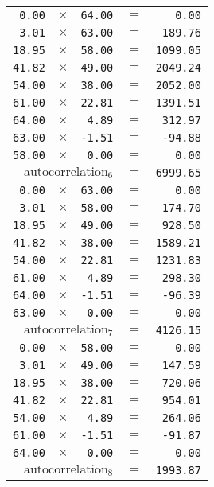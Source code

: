 {\begin{tabular}{rrrrr}
  \texttt{0.00} & $\times$ & \texttt{64.00} & $=$ & \texttt{0.00} \\
  \texttt{3.01} & $\times$ & \texttt{63.00} & $=$ & \texttt{189.76} \\
  \texttt{18.95} & $\times$ & \texttt{58.00} & $=$ & \texttt{1099.05} \\
  \texttt{41.82} & $\times$ & \texttt{49.00} & $=$ & \texttt{2049.24} \\
  \texttt{54.00} & $\times$ & \texttt{38.00} & $=$ & \texttt{2052.00} \\
  \texttt{61.00} & $\times$ & \texttt{22.81} & $=$ & \texttt{1391.51} \\
  \texttt{64.00} & $\times$ & \texttt{4.89} & $=$ & \texttt{312.97} \\
  \texttt{63.00} & $\times$ & \texttt{-1.51} & $=$ & \texttt{-94.88} \\
  \texttt{58.00} & $\times$ & \texttt{0.00} & $=$ & \texttt{0.00} \\
  \hline
  \multicolumn{3}{r}{$\text{autocorrelation}_6$} & $=$ & \texttt{6999.65} \\
  \hline
  \hline
  \texttt{0.00} & $\times$ & \texttt{63.00} & $=$ & \texttt{0.00} \\
  \texttt{3.01} & $\times$ & \texttt{58.00} & $=$ & \texttt{174.70} \\
  \texttt{18.95} & $\times$ & \texttt{49.00} & $=$ & \texttt{928.50} \\
  \texttt{41.82} & $\times$ & \texttt{38.00} & $=$ & \texttt{1589.21} \\
  \texttt{54.00} & $\times$ & \texttt{22.81} & $=$ & \texttt{1231.83} \\
  \texttt{61.00} & $\times$ & \texttt{4.89} & $=$ & \texttt{298.30} \\
  \texttt{64.00} & $\times$ & \texttt{-1.51} & $=$ & \texttt{-96.39} \\
  \texttt{63.00} & $\times$ & \texttt{0.00} & $=$ & \texttt{0.00} \\
  \hline
  \multicolumn{3}{r}{$\text{autocorrelation}_7$} & $=$ & \texttt{4126.15} \\
  \hline
  \hline
  \texttt{0.00} & $\times$ & \texttt{58.00} & $=$ & \texttt{0.00} \\
  \texttt{3.01} & $\times$ & \texttt{49.00} & $=$ & \texttt{147.59} \\
  \texttt{18.95} & $\times$ & \texttt{38.00} & $=$ & \texttt{720.06} \\
  \texttt{41.82} & $\times$ & \texttt{22.81} & $=$ & \texttt{954.01} \\
  \texttt{54.00} & $\times$ & \texttt{4.89} & $=$ & \texttt{264.06} \\
  \texttt{61.00} & $\times$ & \texttt{-1.51} & $=$ & \texttt{-91.87} \\
  \texttt{64.00} & $\times$ & \texttt{0.00} & $=$ & \texttt{0.00} \\
  \hline
  \multicolumn{3}{r}{$\text{autocorrelation}_8$} & $=$ & \texttt{1993.87}
\end{tabular}
}
\clearpage

